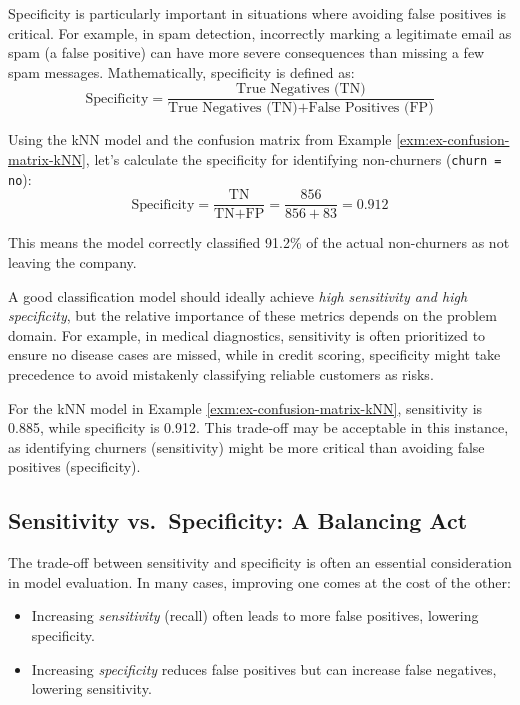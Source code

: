 \documentclass[
  11pt,
]{book}
\newcommand{\passthrough}[1]{#1}
\providecommand{\tightlist}{%
  \setlength{\itemsep}{0pt}\setlength{\parskip}{0pt}}
\theoremstyle{definition}
\theoremstyle{definition}
\theoremstyle{definition}
\theoremstyle{definition}
\theoremstyle{remark}
\begin{document}
Specificity is particularly important in situations where avoiding false positives is critical. For example, in spam detection, incorrectly marking a legitimate email as spam (a false positive) can have more severe consequences than missing a few spam messages. Mathematically, specificity is defined as:\\
\[
\text{Specificity} = \frac{\text{True Negatives (TN)}}{\text{True Negatives (TN)} + \text{False Positives (FP)}}
\]

Using the kNN model and the confusion matrix from Example \ref{exm:ex-confusion-matrix-kNN}, let's calculate the specificity for identifying non-churners (\passthrough{\lstinline!churn = no!}):\\
\[
\text{Specificity} = \frac{\text{TN}}{\text{TN} + \text{FP}} = \frac{856}{856 + 83} = 0.912
\]

This means the model correctly classified 91.2\% of the actual non-churners as not leaving the company.

A good classification model should ideally achieve \emph{high sensitivity and high specificity}, but the relative importance of these metrics depends on the problem domain. For example, in medical diagnostics, sensitivity is often prioritized to ensure no disease cases are missed, while in credit scoring, specificity might take precedence to avoid mistakenly classifying reliable customers as risks.

For the kNN model in Example \ref{exm:ex-confusion-matrix-kNN}, sensitivity is 0.885, while specificity is 0.912. This trade-off may be acceptable in this instance, as identifying churners (sensitivity) might be more critical than avoiding false positives (specificity).

\subsection*{Sensitivity vs.~Specificity: A Balancing Act}\label{sensitivity-vs.-specificity-a-balancing-act}


The trade-off between sensitivity and specificity is often an essential consideration in model evaluation. In many cases, improving one comes at the cost of the other:

\begin{itemize}
\tightlist
\item
  Increasing \emph{sensitivity} (recall) often leads to more false positives, lowering specificity.
\item
  Increasing \emph{specificity} reduces false positives but can increase false negatives, lowering sensitivity.
\end{itemize}
\end{document}

